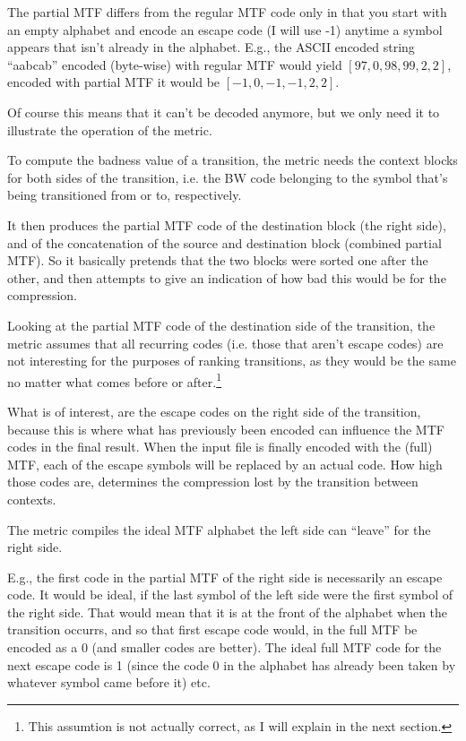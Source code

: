 \documentclass[a4paper]{scrreprt}
\begin{document}
The partial MTF differs from the regular MTF code only in that you start with an
empty alphabet and encode an escape code (I will use -1) anytime a symbol
appears that isn't already in the alphabet.
E.g., the ASCII encoded string ``aabcab'' encoded (byte-wise) with regular MTF
would yield \([97, 0, 98, 99, 2, 2]\), encoded with partial MTF it would be
\([-1, 0, -1, -1, 2, 2]\).


Of course this means that it can't be decoded anymore, but we only need it to
illustrate the operation of the metric.

To compute the badness value of a transition, the metric needs the context
blocks for both sides of the transition, i.e. the BW code belonging to the
symbol that's being transitioned from or to, respectively.

It then produces the partial MTF code of the destination block (the right
side), and of the concatenation of the source and destination block (combined
partial MTF).
So it  basically pretends that the two blocks were sorted one after the other,
and then attempts to give an indication of how bad this would be for the
compression.

Looking at the partial MTF code of the destination side of the transition, the
metric assumes that all recurring codes (i.e. those that aren't escape codes)
are not interesting for the purposes of ranking transitions, as they would be
the same no matter what comes before or after.\footnote{This assumtion is not
actually correct, as I will explain in the next section.}

What is of interest, are the escape codes on the right side of the transition,
because this is where what has previously been encoded can influence the MTF
codes in the final result. When the input file is finally encoded with the
(full) MTF, each of the escape symbols will be replaced by an actual code. How
high those codes are, determines the compression lost by the transition between
contexts.

The metric compiles the ideal MTF alphabet the left side can ``leave'' for the
right side.

E.g., the first code in the partial MTF of the right side is necessarily an
escape code. It would be ideal, if the last symbol of the left side were the
first symbol of the right side. That would mean that it is at the front of the
alphabet when the transition occurrs, and so that first escape code would, in
the full MTF be encoded as a 0 (and smaller codes are better). The ideal full
MTF code for the next escape code is 1 (since the code 0 in the alphabet has
already been taken by whatever symbol came before it) etc.
\end{document}
